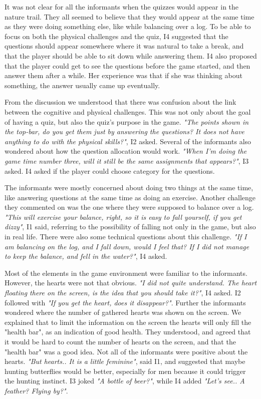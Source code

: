 It was not clear for all the informants when the quizzes would appear in the nature trail. They all seemed to believe that they would appear at the same time as they were doing something else, like while balancing over a log. To be able to focus on both the physical challenges and the quiz, I4 suggested that the questions should appear somewhere where it was natural to take a break, and that the player should be able to sit down while answering them. I4 also proposed that the player could get to see the questions before the game started, and then answer them after a while. Her experience was that if she was thinking about something, the answer usually came up eventually. 

From the discussion we understood that there was confusion about the link between the cognitive and physical challenges. This was not only about the goal of having a quiz, but also the quiz's purpose in the game. \emph{"The points shown in the top-bar, do you get them just by answering the questions? It does not have anything to do with the physical skills?"}, I2 asked. Several of the informants also wondered about how the question allocation would work. \emph{"When I'm doing the game time number three, will it still be the same assignments that appears?"}, I3 asked. I4 asked if the player could choose category for the questions.  

The informants were mostly concerned about doing two things at the same time, like answering questions at the same time as doing an exercise. Another challenge they commented on was the one where they were supposed to balance over a log. \emph{"This will exercise your balance, right, so it is easy to fall yourself, if you get dizzy"}, I1 said, referring to the possibility of falling not only in the game, but also in real life. There were also some technical questions about this challenge. \emph{"If I am balancing on the log, and I fall down, would I feel that? If I did not manage to keep the balance, and fell in the water?"}, I4 asked. 

Most of the elements in the game environment were familiar to the informants. However, the hearts were not that obvious. \emph{"I did not quite understand. The heart floating there on the screen, is the idea that you should take it?"}, I4 asked. I2 followed with \emph{"If you get the heart, does it disappear?"}. Further the informants wondered where the number of gathered hearts was shown on the screen. We explained that to limit the information on the screen the hearts will only fill the "health bar", as an indication of good health. They understood, and agreed that it would be hard to count the number of hearts on the screen, and that the "health bar" was a good idea. Not all of the informants were positive about the hearts. \emph{"But hearts.. It is a little feminine"}, said I1, and suggested that maybe hunting butterflies would be better, especially for men because it could trigger the hunting instinct. I3 joked \emph{"A bottle of beer?"}, while I4 added \emph{"Let's see.. A feather? Flying by?"}. 


